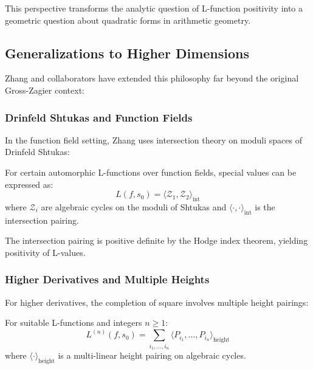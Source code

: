 This perspective transforms the analytic question of L-function positivity into a geometric question about quadratic forms in arithmetic geometry.

\subsection{Generalizations to Higher Dimensions}

Zhang and collaborators have extended this philosophy far beyond the original Gross-Zagier context:

\subsubsection{Drinfeld Shtukas and Function Fields}

In the function field setting, Zhang uses intersection theory on moduli spaces of Drinfeld Shtukas:

\begin{theorem}
\label{thm:zhang_function_field}
For certain automorphic L-functions over function fields, special values can be expressed as:
\begin{equation}
L(f, s_0) = \langle \mathcal{Z}_1, \mathcal{Z}_2 \rangle_{\text{int}}
\end{equation}
where $\mathcal{Z}_i$ are algebraic cycles on the moduli of Shtukas and $\langle \cdot, \cdot \rangle_{\text{int}}$ is the intersection pairing.
\end{theorem}

The intersection pairing is positive definite by the Hodge index theorem, yielding positivity of L-values.

\subsubsection{Higher Derivatives and Multiple Heights}

For higher derivatives, the completion of square involves multiple height pairings:

\begin{conjecture}
\label{conj:gen_gross_zagier}
For suitable L-functions and integers $n \geq 1$:
\begin{equation}
L^{(n)}(f, s_0) = \sum_{i_1, \ldots, i_n} \langle P_{i_1}, \ldots, P_{i_n} \rangle_{\text{height}}
\end{equation}
where $\langle \cdot \rangle_{\text{height}}$ is a multi-linear height pairing on algebraic cycles.
\end{conjecture}

